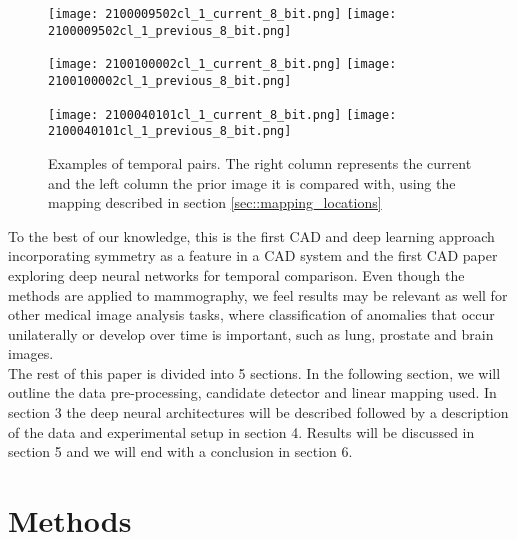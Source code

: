 \documentclass[12pt]{spieman}  %
\begin{document}
\begin{figure}
 \centering
 \texttt{[image: 2100009502cl\_1\_current\_8\_bit.png]}
 \texttt{[image: 2100009502cl\_1\_previous\_8\_bit.png]} \\\vspace{0.4cm}
 
 \texttt{[image: 2100100002cl\_1\_current\_8\_bit.png]}
 \texttt{[image: 2100100002cl\_1\_previous\_8\_bit.png]} \\\vspace{0.4cm}
 
  \texttt{[image: 2100040101cl\_1\_current\_8\_bit.png]}
 \texttt{[image: 2100040101cl\_1\_previous\_8\_bit.png]} \\
 \caption{Examples of temporal pairs. The right column represents the current and the left column the prior image it is compared with, using the mapping described in section \ref{sec::mapping_locations}}
 \label{fig::temporal_pair_examples}
\end{figure}

To the best of our knowledge, this is the first CAD and deep learning approach incorporating symmetry as a feature in a CAD system and the first CAD paper exploring deep neural networks for temporal comparison. Even though the methods are applied to mammography, we feel results may be relevant as well for other medical image analysis tasks, where classification of anomalies that occur unilaterally or develop over time is important, such as lung, prostate and brain images. \\

The rest of this paper is divided into 5 sections. In the following section, we will outline the data pre-processing, candidate detector and linear mapping used. In section 3 the deep neural architectures will be described followed by a description of the data and experimental setup in section 4. Results will be discussed in section 5 and we will end with a conclusion in section 6.

\section{Methods}
\end{document}
